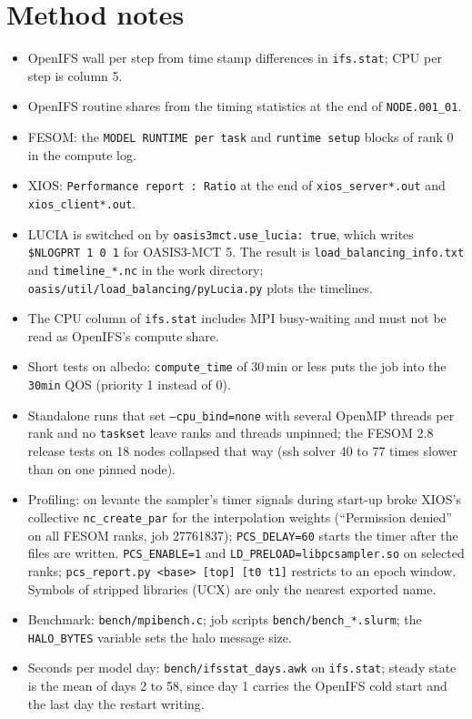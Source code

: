 \documentclass[11pt,a4paper]{article}
\begin{document}
\section{Method notes}
\begin{itemize}
\item OpenIFS wall per step from time stamp differences in \texttt{ifs.stat}; CPU per step is column 5.
\item OpenIFS routine shares from the timing statistics at the end of \texttt{NODE.001\_01}.
\item FESOM: the \texttt{MODEL RUNTIME per task} and \texttt{runtime setup} blocks of rank 0 in the compute log.
\item XIOS: \texttt{Performance report : Ratio} at the end of \texttt{xios\_server*.out} and \texttt{xios\_client*.out}.
\item LUCIA is switched on by \texttt{oasis3mct.use\_lucia: true}, which writes \texttt{\$NLOGPRT 1 0 1} for OASIS3-MCT 5. The result is \texttt{load\_balancing\_info.txt} and \texttt{timeline\_*.nc} in the work directory; \texttt{oasis/util/load\_balancing/pyLucia.py} plots the timelines.
\item The CPU column of \texttt{ifs.stat} includes MPI busy-waiting and must not be read as OpenIFS's compute share.
\item Short tests on albedo: \texttt{compute\_time} of 30\,min or less puts the job into the \texttt{30min} QOS (priority 1 instead of 0).
\item Standalone runs that set \texttt{--cpu\_bind=none} with several OpenMP threads per rank and no \texttt{taskset} leave ranks and threads unpinned; the FESOM 2.8 release tests on 18 nodes collapsed that way (ssh solver 40 to 77 times slower than on one pinned node).
\item Profiling: on levante the sampler's timer signals during start-up broke XIOS's collective \texttt{nc\_create\_par} for the interpolation weights (``Permission denied'' on all FESOM ranks, job 27761837); \texttt{PCS\_DELAY=60} starts the timer after the files are written. \texttt{PCS\_ENABLE=1} and \texttt{LD\_PRELOAD=libpcsampler.so} on selected ranks; \texttt{pcs\_report.py <base> [top] [t0 t1]} restricts to an epoch window. Symbols of stripped libraries (UCX) are only the nearest exported name.
\item Benchmark: \texttt{bench/mpibench.c}; job scripts \texttt{bench/bench\_*.slurm}; the \texttt{HALO\_BYTES} variable sets the halo message size.
\item Seconds per model day: \texttt{bench/ifsstat\_days.awk} on \texttt{ifs.stat}; steady state is the mean of days 2 to 58, since day 1 carries the OpenIFS cold start and the last day the restart writing.

\end{itemize}
\end{document}
